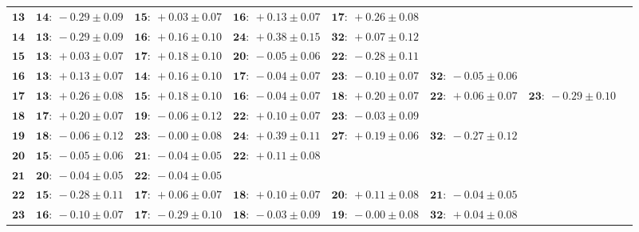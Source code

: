 \begin{landscape}
    \begin{table}[p]
        \footnotesize
        \begin{tabular}{r|lllllll}
            \hline
\( \mathbf{13} \)& \( \mathbf{14:}~-0.29 \pm 0.09 \)& \( \mathbf{15:}~+0.03 \pm 0.07 \)& \( \mathbf{16:}~+0.13 \pm 0.07 \)& \( \mathbf{17:}~+0.26 \pm 0.08 \)\\ 
\( \mathbf{14} \)& \( \mathbf{13:}~-0.29 \pm 0.09 \)& \( \mathbf{16:}~+0.16 \pm 0.10 \)& \( \mathbf{24:}~+0.38 \pm 0.15 \)& \( \mathbf{32:}~+0.07 \pm 0.12 \)\\ 
\( \mathbf{15} \)& \( \mathbf{13:}~+0.03 \pm 0.07 \)& \( \mathbf{17:}~+0.18 \pm 0.10 \)& \( \mathbf{20:}~-0.05 \pm 0.06 \)& \( \mathbf{22:}~-0.28 \pm 0.11 \)\\ 
\( \mathbf{16} \)& \( \mathbf{13:}~+0.13 \pm 0.07 \)& \( \mathbf{14:}~+0.16 \pm 0.10 \)& \( \mathbf{17:}~-0.04 \pm 0.07 \)& \( \mathbf{23:}~-0.10 \pm 0.07 \)& \( \mathbf{32:}~-0.05 \pm 0.06 \)\\ 
\( \mathbf{17} \)& \( \mathbf{13:}~+0.26 \pm 0.08 \)& \( \mathbf{15:}~+0.18 \pm 0.10 \)& \( \mathbf{16:}~-0.04 \pm 0.07 \)& \( \mathbf{18:}~+0.20 \pm 0.07 \)& \( \mathbf{22:}~+0.06 \pm 0.07 \)& \( \mathbf{23:}~-0.29 \pm 0.10 \)\\ 
\( \mathbf{18} \)& \( \mathbf{17:}~+0.20 \pm 0.07 \)& \( \mathbf{19:}~-0.06 \pm 0.12 \)& \( \mathbf{22:}~+0.10 \pm 0.07 \)& \( \mathbf{23:}~-0.03 \pm 0.09 \)\\ 
\( \mathbf{19} \)& \( \mathbf{18:}~-0.06 \pm 0.12 \)& \( \mathbf{23:}~-0.00 \pm 0.08 \)& \( \mathbf{24:}~+0.39 \pm 0.11 \)& \( \mathbf{27:}~+0.19 \pm 0.06 \)& \( \mathbf{32:}~-0.27 \pm 0.12 \)\\ 
\( \mathbf{20} \)& \( \mathbf{15:}~-0.05 \pm 0.06 \)& \( \mathbf{21:}~-0.04 \pm 0.05 \)& \( \mathbf{22:}~+0.11 \pm 0.08 \)\\ 
\( \mathbf{21} \)& \( \mathbf{20:}~-0.04 \pm 0.05 \)& \( \mathbf{22:}~-0.04 \pm 0.05 \)\\ 
\( \mathbf{22} \)& \( \mathbf{15:}~-0.28 \pm 0.11 \)& \( \mathbf{17:}~+0.06 \pm 0.07 \)& \( \mathbf{18:}~+0.10 \pm 0.07 \)& \( \mathbf{20:}~+0.11 \pm 0.08 \)& \( \mathbf{21:}~-0.04 \pm 0.05 \)\\ 
\( \mathbf{23} \)& \( \mathbf{16:}~-0.10 \pm 0.07 \)& \( \mathbf{17:}~-0.29 \pm 0.10 \)& \( \mathbf{18:}~-0.03 \pm 0.09 \)& \( \mathbf{19:}~-0.00 \pm 0.08 \)& \( \mathbf{32:}~+0.04 \pm 0.08 \)\\ 

\end{tabular}
\end{table}
\end{landscape}

